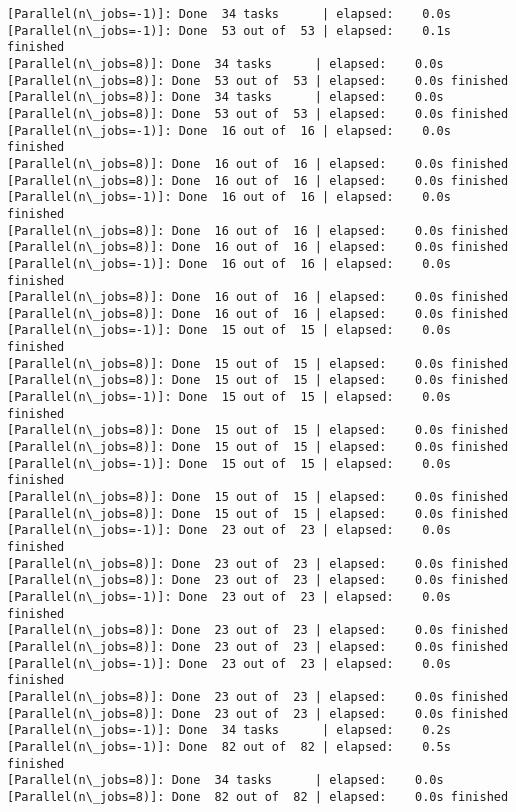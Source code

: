 \documentclass[11pt]{article}
\begin{document}
\begin{Verbatim}[commandchars=\\\{\}]
[Parallel(n\_jobs=-1)]: Done  34 tasks      | elapsed:    0.0s
[Parallel(n\_jobs=-1)]: Done  53 out of  53 | elapsed:    0.1s finished
[Parallel(n\_jobs=8)]: Done  34 tasks      | elapsed:    0.0s
[Parallel(n\_jobs=8)]: Done  53 out of  53 | elapsed:    0.0s finished
[Parallel(n\_jobs=8)]: Done  34 tasks      | elapsed:    0.0s
[Parallel(n\_jobs=8)]: Done  53 out of  53 | elapsed:    0.0s finished
[Parallel(n\_jobs=-1)]: Done  16 out of  16 | elapsed:    0.0s finished
[Parallel(n\_jobs=8)]: Done  16 out of  16 | elapsed:    0.0s finished
[Parallel(n\_jobs=8)]: Done  16 out of  16 | elapsed:    0.0s finished
[Parallel(n\_jobs=-1)]: Done  16 out of  16 | elapsed:    0.0s finished
[Parallel(n\_jobs=8)]: Done  16 out of  16 | elapsed:    0.0s finished
[Parallel(n\_jobs=8)]: Done  16 out of  16 | elapsed:    0.0s finished
[Parallel(n\_jobs=-1)]: Done  16 out of  16 | elapsed:    0.0s finished
[Parallel(n\_jobs=8)]: Done  16 out of  16 | elapsed:    0.0s finished
[Parallel(n\_jobs=8)]: Done  16 out of  16 | elapsed:    0.0s finished
[Parallel(n\_jobs=-1)]: Done  15 out of  15 | elapsed:    0.0s finished
[Parallel(n\_jobs=8)]: Done  15 out of  15 | elapsed:    0.0s finished
[Parallel(n\_jobs=8)]: Done  15 out of  15 | elapsed:    0.0s finished
[Parallel(n\_jobs=-1)]: Done  15 out of  15 | elapsed:    0.0s finished
[Parallel(n\_jobs=8)]: Done  15 out of  15 | elapsed:    0.0s finished
[Parallel(n\_jobs=8)]: Done  15 out of  15 | elapsed:    0.0s finished
[Parallel(n\_jobs=-1)]: Done  15 out of  15 | elapsed:    0.0s finished
[Parallel(n\_jobs=8)]: Done  15 out of  15 | elapsed:    0.0s finished
[Parallel(n\_jobs=8)]: Done  15 out of  15 | elapsed:    0.0s finished
[Parallel(n\_jobs=-1)]: Done  23 out of  23 | elapsed:    0.0s finished
[Parallel(n\_jobs=8)]: Done  23 out of  23 | elapsed:    0.0s finished
[Parallel(n\_jobs=8)]: Done  23 out of  23 | elapsed:    0.0s finished
[Parallel(n\_jobs=-1)]: Done  23 out of  23 | elapsed:    0.0s finished
[Parallel(n\_jobs=8)]: Done  23 out of  23 | elapsed:    0.0s finished
[Parallel(n\_jobs=8)]: Done  23 out of  23 | elapsed:    0.0s finished
[Parallel(n\_jobs=-1)]: Done  23 out of  23 | elapsed:    0.0s finished
[Parallel(n\_jobs=8)]: Done  23 out of  23 | elapsed:    0.0s finished
[Parallel(n\_jobs=8)]: Done  23 out of  23 | elapsed:    0.0s finished
[Parallel(n\_jobs=-1)]: Done  34 tasks      | elapsed:    0.2s
[Parallel(n\_jobs=-1)]: Done  82 out of  82 | elapsed:    0.5s finished
[Parallel(n\_jobs=8)]: Done  34 tasks      | elapsed:    0.0s
[Parallel(n\_jobs=8)]: Done  82 out of  82 | elapsed:    0.0s finished

    \end{Verbatim}
\end{document}
